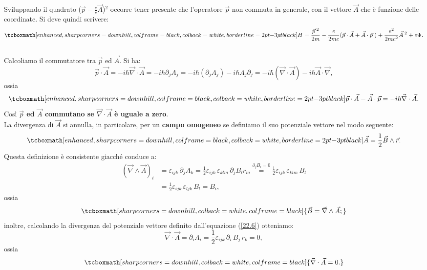 \documentclass[a4paper,12pt,oneside]{book}
\begin{document}
Sviluppando il quadrato ($\vec{p}-\frac{e}{c}\vec{A}$)$^{2}$ occorre tener presente che l'operatore $\vec{p}$ non commuta in generale, con il vettore $\vec{A}$ che è funzione delle coordinate. Si deve quindi scrivere:
	\begin{equation}
		\tcboxmath[enhanced, sharp corners=downhill, colframe=black, colback=white, borderline={2pt}{-3pt}{black}]{
			H= \frac{\vec{p}^{\;2}}{2m}-\frac{e}{2mc}(\vec{p}\cdot\vec{A}+\vec{A}\cdot\vec{p}\;)+\frac{e^{2}}{2mc^{2}}\vec{A}^{\;2}+e\Phi .
			}
	\label{22.4}
	\end{equation}\\
	
Calcoliamo il commutatore tra $\vec{p}$ ed $\vec{A}$. Si ha:
	\begin{equation}
		\vec{p}\cdot\vec{A}=-i\hbar \vec{\nabla}\cdot\vec{A}=-i\hbar\partial_{j}A_{j}= -i\hbar(\partial_{j}A_{j})-i\hbar A_{j}\partial_{j}= -i\hbar(\vec{\nabla}\cdot\vec{A})-i\hbar\vec{A}\cdot\vec{\nabla} ,
	\end{equation}
ossia
	\begin{equation}
		\tcboxmath[enhanced, sharp corners=downhill, colframe=black, colback=white, borderline={2pt}{-3pt}{black}]{
			\vec{p}\cdot\vec{A}-\vec{A}\cdot\vec{p}=-i\hbar\vec{\nabla}\cdot\vec{A}.
			}
	\end{equation}
Così \textbf{$\vec{p}$ ed $\vec{A}$ commutano se $\vec{\nabla}\cdot\vec{A}$ è uguale a zero}.\\

La divergenza di $\vec{A}$ si annulla, in particolare, per un \textbf{campo omogeneo} se definiamo il suo potenziale vettore nel modo seguente:
	\begin{equation}
		\tcboxmath[enhanced, sharp corners=downhill, colframe=black, colback=white, borderline={2pt}{-3pt}{black}]{
			\vec{A}=\frac{1}{2}\vec{B}\wedge\vec{r} .
			}
	\label{22.6}
	\end{equation}
Questa definizione è consistente giacché conduce a:
	\begin{align}
		(\vec{\nabla}\wedge\vec{A})_{i}&= \varepsilon_{ijk}\,\partial_{j}A_{k}=\frac{1}{2}\varepsilon_{ijk}\,\varepsilon_{klm}\,\partial_{j}B_{l}r_{m} \overset{\partial_{j}B_{l}=0}{=}  \frac{1}{2}\varepsilon_{ijk}\,\varepsilon_{klm}\,B_{l} \nonumber \\
		&=\frac{1}{2}\varepsilon_{ijk}\,\varepsilon_{ljk}\,B_{l}=B_{i} ,
	\end{align}
ossia
	\begin{equation}
		\tcboxmath[sharp corners=downhill, colback=white, colframe=black]{
			\vec{B}=\vec{\nabla}\wedge\vec{A};
			}
\end{equation}
inoltre, calcolando la divergenza del potenziale vettore definito dall'equazione (\ref{22.6}) otteniamo:
	\begin{equation}
		\vec{\nabla}\cdot\vec{A}=\partial_{i}A_{i}=\frac{1}{2}\varepsilon_{ijk}\, \partial_{i}\, B_{j}\, r_{k}=0 ,
	\end{equation}
ossia 
	\begin{equation}
		\tcboxmath[sharp corners=downhill, colback=white, colframe=black]{
			\vec{\nabla}\cdot\vec{A}=0.
			}
	\end{equation}\\
	
\end{document}
